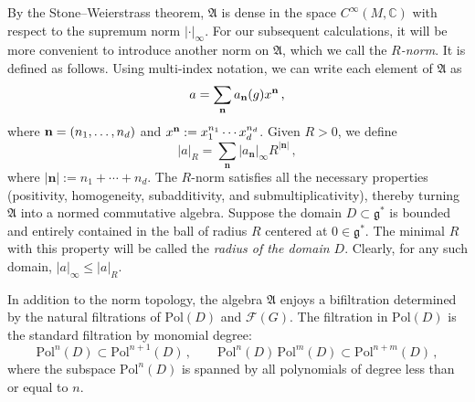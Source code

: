 \documentclass[12pt,a4paper]{article}
\numberwithin{equation}{section}
\theoremstyle{theorem}
\theoremstyle{remark}
\newcommand{\fg}{\mathcal{F}(G)}
\newcommand{\gs}{\mathfrak{g}^\ast}
\newcommand{\fa}{\mathfrak{A}}
\newcommand{\pold}{\mathrm{Pol}(D )}
\begin{document}
By the Stone--Weierstrass theorem, $\fa$ is dense in the space $C^\infty(M, \mathbb{C})$ with respect to the supremum norm $|\cdot|_\infty$. %
For our subsequent calculations, it will be more convenient to introduce another norm on
$\fa$, which we call the {\it 
$R$-norm}. It is defined as follows. Using multi-index notation, we can write each element of $\fa$ as
\begin{equation}\label{MI}
    a=\sum_{\bf{n}}a_{\bf n}(g)x^{\bf{n}}\,,
\end{equation}
where ${\bf n}=(n_1,\ldots,n_d)$ and $x^{\bf n}:=x_1^{n_1}\cdots x^{n_d}_d$. Given $R>0$, we define 
\begin{equation}\label{RN}
|a|_R=\sum_{\mathbf{n}}|a_{\mathbf{n}}|_{\infty}R^{|\mathbf{n}|}\,,
\end{equation}
where $|\mathbf{n}|:=n_1+\cdots+n_d$. The $R$-norm satisfies all the necessary properties (positivity, homogeneity, subadditivity, and submultiplicativity), thereby turning $\fa$ into a normed commutative algebra.   Suppose the domain $D\subset \gs$ is bounded and entirely  contained in the ball of radius $R$ centered at $0\in \gs$. The minimal $R$ with this property will be called the {\it radius of the domain $D$}. Clearly, for any such domain, $|a|_\infty\leq |a|_R$. 

In addition to the norm topology, the algebra $\fa$ enjoys a bifiltration determined by the natural filtrations of $\pold$ and $\fg$. The filtration 
in $\pold$ is the standard  filtration by monomial degree:
\begin{equation}
    \mathrm{Pol}^n(D)\subset \mathrm{Pol}^{n+1}(D)\,,\qquad \mathrm{Pol}^n(D) \, \mathrm{Pol}^m(D)\subset \mathrm{Pol}^{n+m}(D)\,,
    \end{equation}
where the subspace $\mathrm{Pol}^n(D)$ is spanned by all polynomials of  degree less than or equal to $n$. 
\end{document}
